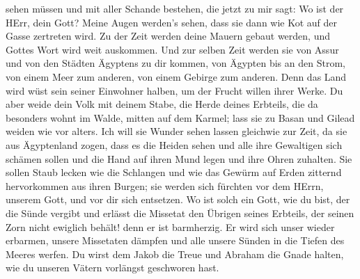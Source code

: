 sehen müssen und mit aller Schande bestehen, die jetzt zu mir sagt: Wo
ist der HErr, dein Gott? Meine Augen werden's sehen, dass sie dann wie
Kot auf der Gasse zertreten wird.  Zu der Zeit werden deine
Mauern gebaut werden, und Gottes Wort wird weit auskommen. 
Und zur selben Zeit werden sie von Assur und von den Städten Ägyptens zu
dir kommen, von Ägypten bis an den Strom, von einem Meer zum anderen,
von einem Gebirge zum anderen.  Denn das Land wird wüst
sein seiner Einwohner halben, um der Frucht willen ihrer Werke.
 Du aber weide dein Volk mit deinem Stabe, die Herde deines
Erbteils, die da besonders wohnt im Walde, mitten auf dem Karmel; lass
sie zu Basan und Gilead weiden wie vor alters.  Ich will
sie Wunder sehen lassen gleichwie zur Zeit, da sie aus Ägyptenland
zogen,  dass es die Heiden sehen und alle ihre Gewaltigen
sich schämen sollen und die Hand auf ihren Mund legen und ihre Ohren
zuhalten.  Sie sollen Staub lecken wie die Schlangen und
wie das Gewürm auf Erden zitternd hervorkommen aus ihren Burgen; sie
werden sich fürchten vor dem HErrn, unserem Gott, und vor dir sich
entsetzen.  Wo ist solch ein Gott, wie du bist, der die
Sünde vergibt und erlässt die Missetat den Übrigen seines Erbteils, der
seinen Zorn nicht ewiglich behält! denn er ist barmherzig. 
Er wird sich unser wieder erbarmen, unsere Missetaten dämpfen und alle
unsere Sünden in die Tiefen des Meeres werfen.  Du wirst
dem Jakob die Treue und Abraham die Gnade halten, wie du unseren Vätern
vorlängst geschworen hast.
